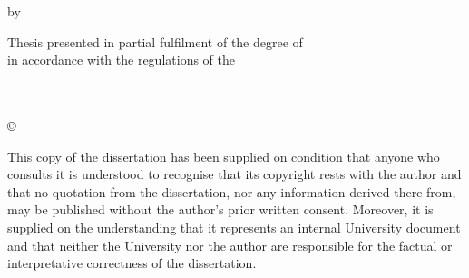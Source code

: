 \thispagestyle{empty}
\vskip 3cm
\begin{center}
    {\Huge\bfseries\sf \mytitle \par}
    \vskip 0.5cm
    \sf by
    \vskip 0.5cm
    \large \sf \authorname \\
    \sf \authornumber
\end{center}

\begin{center}
	\large \sf Thesis presented in partial fulfilment of the degree of \degname \\ in accordance with the regulations of the \univname
\end{center}

\vskip 3cm

\begin{minipage}{0.4\textwidth}
\begin{flushleft} 
\large \sf 
\depname \\
\univname \\
\univaddr
\vskip 0.5cm
\copyright~\mydate~\authorname
\end{flushleft}
\end{minipage}


\begin{minipage}{\textwidth}
\begin{flushleft}
\sf This copy of the dissertation has been supplied on condition that anyone who consults it is understood to recognise that its copyright rests with the author and that no quotation from the dissertation, nor any information derived there from, may be published without the author's prior written consent. Moreover, it is supplied on the understanding that it represents an internal University document and that neither the University nor the author are responsible for the factual or interpretative correctness of the dissertation.
\end{flushleft}
\end{minipage}

\vfill

\newpage